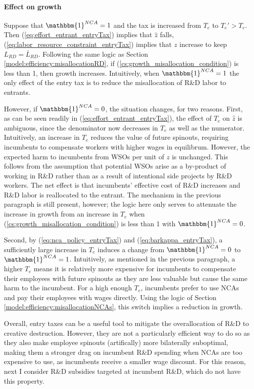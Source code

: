 \documentclass[11pt,english]{article}
\begin{document}
\paragraph{Effect on growth}

Suppose that $\mathbbm{1}^{NCA} = 1$ and the tax is increased from $T_e$ to $T_e' > T_e$. Then (\ref{eq:effort_entrant_entryTax}) implies that $\hat{z}$ falls, (\ref{eq:labor_resource_constraint_entryTax}) implies that $z$ increase to keep $L_{RD} = \bar{L}_{RD}$. Following the same logic as Section \ref{model:efficiency:misallocationRD}, if (\ref{cs:growth_misallocation_condition}) is less than 1, then growth increases. Intuitively, when $\mathbbm{1}^{NCA} = 1$ the only effect of the entry tax is to reduce the misallocation of R\&D labor to entrants. 

However, if $\mathbbm{1}^{NCA} = 0$, the situation changes, for two reasons. First, as can be seen readily in (\ref{eq:effort_entrant_entryTax}), the effect of $T_e$ on $\hat{z}$ is ambiguous, since the denominator now decreases in $T_e$ as well as the numerator. Intuitively, an increase in $T_e$ reduces the value of future spinouts, requiring incumbents to compensate workers with higher wages in equilibrum. However, the expected harm to incumbents from WSOs per unit of $z$ is unchanged. This follows from the assumption that potential WSOs arise as a by-product of working in R\&D rather than as a result of intentional side projects by R\&D workers. The net effect is that incumbents' effective cost of R\&D increases and R\&D labor is reallocated to the entrant. The mechanism in the previous paragraph is still present, however; the logic here only serves to attenuate the increase in growth from an increase in $T_e$ when (\ref{cs:growth_misallocation_condition}) is less than 1 with $\mathbbm{1}^{NCA} = 0$.

Second, by (\ref{eq:nca_policy_entryTax}) and (\ref{eq:barkappa_entryTax}), a sufficiently large increase in $T_e$ induces a change from $\mathbbm{1}^{NCA} = 0$ to $\mathbbm{1}^{NCA} = 1$. Intuitively, as mentioned in the previous paragraph, a higher $T_e$ means it is relatively more expensive for incumbents to compensate their employees with future spinouts as they are less valuable but cause the same harm to the incumbent. For a high enough $T_e$, incumbents prefer to use NCAs and pay their employees with wages directly. Using the logic of Section \ref{model:efficiency:misallocationNCAs}, this switch implies a reduction in growth.

Overall, entry taxes can be a useful tool to mitigate the overallocation of R\&D to creative destruction. However, they are not a particularly efficient way to do so as they also make employee spinouts (artifically) more bilaterally suboptimal, making them a stronger drag on incumbent R\&D spending when NCAs are too expensive to use, as incumbents receive a smaller wage discount. For this reason, next I consider R\&D subsidies targeted at incumbent R\&D, which do not have this property.  
\end{document}
